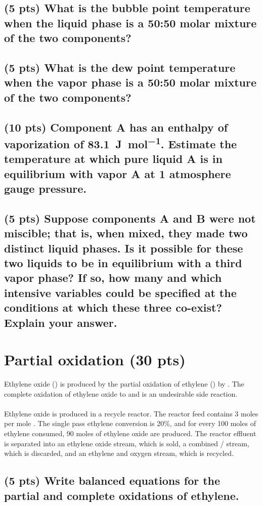 \documentclass[11pt]{article}
\begin{document}
\subsection{(5 pts) What is the \textbf{bubble point} temperature when the liquid phase is a 50:50 molar mixture of the two components?}
\label{sec-1-4}
\vspace{2cm}
\subsection{(5 pts) What is the \textbf{dew point} temperature when the vapor phase is a 50:50 molar mixture of the two components?}
\label{sec-1-5}
\vspace{2cm}
\subsection{(10 pts) Component A has an enthalpy of vaporization of \SI{83.1}{\joule\per\mole}. Estimate the temperature at which pure liquid A is in equilibrium with vapor A at 1 atmosphere gauge pressure.}
\label{sec-1-6}
\newpage
\subsection{(5 pts) Suppose components A and B were not miscible; that is, when mixed, they made two distinct liquid phases. Is it possible for these two liquids to be in equilibrium with a third vapor phase?  If so, how many and which intensive variables could be specified at the conditions at which these three co-exist?  Explain your answer.}
\label{sec-1-7}
\newpage
\section{Partial oxidation (30 pts)}
\label{sec-2}
Ethylene oxide () is produced by the partial oxidation of ethylene () by .  The complete oxidation of ethylene oxide to  and  is an undesirable side reaction.
\\ \\
Ethylene oxide is produced in a recycle reactor.  The reactor feed contains 3 moles  per mole . The single pass ethylene conversion is 20\%, and for every 100 moles of ethylene consumed, 90 moles of ethylene oxide are produced.  The reactor effluent is separated into an ethylene oxide stream, which is sold, a combined / stream, which is discarded, and an ethylene and oxygen stream, which is recycled.
\subsection{(5 pts) Write balanced equations for the partial and complete oxidations of ethylene.}
\label{sec-2-1}
\vspace{6cm}
\end{document}
